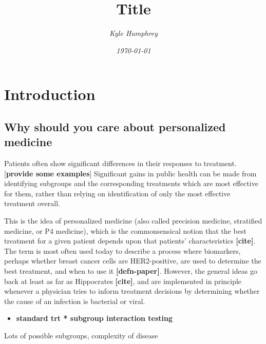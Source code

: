 \documentclass[12pt]{article}
\title{\normalfont \Large Title}
\author{\normalsize \sl Kyle Humphrey}
\date{\normalsize \sl \today}
\begin{document}
\maketitle

\section{Introduction}

\subsection{Why should you care about personalized medicine} %
\label{sub:why_should_you_care_about_personalized_medicine}



Patients often show significant differences in their responses to treatment. [\textbf{provide some examples}] Significant gains in public health can be made from identifying subgroups and the corresponding treatments which are most effective for them, rather than relying on identification of only the most effective treatment overall.

This is the idea of personalized medicine (also called precision medicine, stratified medicine, or P4 medicine), which is the commonsensical notion that the best treatment for a given patient depends upon that patients' characteristics \textbf{[cite]}. The term is most often used today to describe a process where biomarkers, perhaps whether breast cancer cells are HER2-positive, are used to determine the best treatment, and when to use it \textbf{[defn-paper]}.
However, the general ideas go back at least as far as Hippocrates \textbf{[cite]}, and are implemented in principle whenever a physician tries to inform treatment decisions by determining whether the cause of an infection is bacterial or viral.


\begin{itemize}
  \item \textbf{standard trt * subgroup interaction testing}
\end{itemize}


Lots of possible subgroups, complexity of disease
\end{document}
